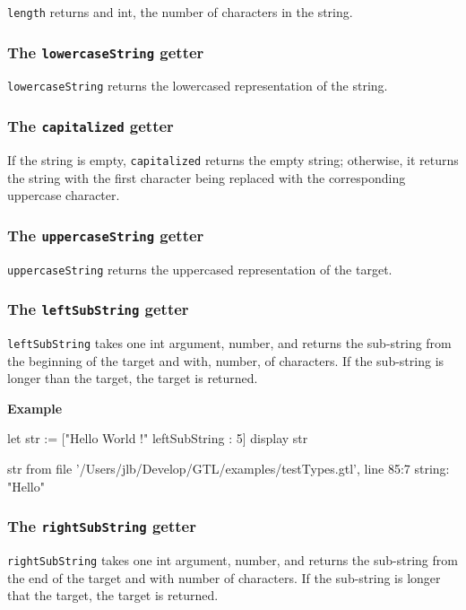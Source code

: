 \documentclass[10pt,openright,twosides,final]{memoir}
\newcommand{\gtlarg}[1]{{\footnotesize\ttfamily\colorbox{light-blue}{#1}}}
\newcommand{\gtlinline}[1]{\colorbox{light-blue}{\lstinline[language=gtl]{#1}}}
\newcommand{\example}{\vspace{.75em}\noindent\textbf{Example}\vspace{0em}}
\begin{document}
\gtlinline{length} returns and int, the number of characters in the string.

\subsubsection{The \texttt{lowercaseString} getter}

\gtlinline{lowercaseString} returns the lowercased representation of the string.

\subsubsection{The \texttt{capitalized} getter}

If the string is empty, \gtlinline{capitalized} returns the empty string; otherwise, it returns the string with the first character being replaced with the corresponding uppercase character.

\subsubsection{The \texttt{uppercaseString} getter}

\gtlinline{uppercaseString} returns the uppercased representation of the target.

\subsubsection{The \texttt{leftSubString} getter}

\gtlinline{leftSubString} takes one int argument, \gtlarg{number}, and returns the sub-string from the beginning of the target and with, \gtlarg{number}, of characters. If the sub-string is longer than the target, the target is returned.

\example
\begin{gtl}
let str := ["Hello World !" leftSubString : 5]
display str
\end{gtl}
\begin{console}
str from file '/Users/jlb/Develop/GTL/examples/testTypes.gtl', line 85:7
    string: "Hello"
\end{console}

\subsubsection{The \texttt{rightSubString} getter}

\gtlinline{rightSubString} takes one int argument, \gtlarg{number}, and returns the sub-string from the end of the target and with \gtlarg{number} of characters. If the sub-string is longer that the target, the target is returned.
\end{document}
